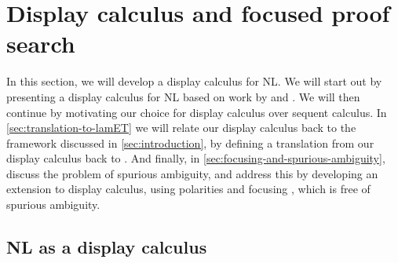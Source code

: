 \section{Display calculus and focused proof search}
\label{sec:display-calculus}

In this section, we will develop a display calculus
\citep{belnap1982} for NL. We will start out by presenting a display
calculus for NL based on work by \citet{moortgat2009,moortgat2012} and
\citet{gore1998}. We will then continue by motivating our choice for
display calculus over sequent calculus.
In \autoref{sec:translation-to-lamET} we will relate our display
calculus back to the framework discussed in \autoref{sec:introduction},
by defining a translation from our display calculus back to \lamPET.
And finally, in \autoref{sec:focusing-and-spurious-ambiguity}, discuss
the problem of spurious ambiguity, and address this by developing an
extension to display calculus, using polarities and focusing
\citep{girard1991,bastenhof2011}, which is free of spurious
ambiguity.



\subsection{NL as a display calculus}
\label{sec:nl-as-a-display-calculus}


